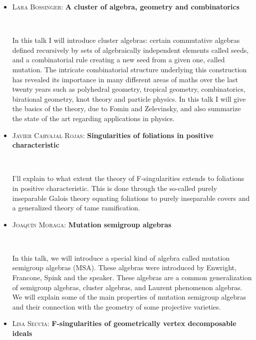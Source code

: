 \documentclass[12pt]{amsart}
\begin{document}
\begin{itemize}

\vfill

\item \textsc{Lara Bossinger:} \textbf{A cluster of algebra, geometry and combinatorics}

\

\noindent  In this talk I will introduce cluster algebras: certain commutative algebras defined recursively by sets of algebraically independent elements called seeds, and a combinatorial rule creating a new seed from a given one, called mutation. The intricate combinatorial structure underlying this construction has revealed its importance in many different areas of maths over the last twenty years such as polyhedral geometry, tropical geometry, combinatorics, birational geometry, knot theory and particle physics. In this talk I will give the basics of the theory, due to Fomin and Zelevinsky, and also summarize the state of the art regarding applications in physics.

\vfill

\item  \textsc{Javier Carvajal Rojas:}  \textbf{Singularities of foliations in positive characteristic}

\

\noindent  I'll explain to what extent the theory of F-singularities extends to foliations in positive characteristic. This is done through the so-called purely inseparable Galois theory equating foliations to purely inseparable covers and a generalized theory of tame ramification. 

\vfill

\item  \textsc{Joaqu\'in Moraga:} \textbf{Mutation semigroup algebras}

\

\noindent  In this talk, we will introduce a special kind of algebra called mutation semigroup algebras (MSA). 
These algebras were introduced by Enwright, Francone, Spink and the speaker. 
These algebras are a common generalization of semigroup algebras, cluster algebras, and Laurent phenomenon algebras. 
We will explain some of the main properties of mutation semigroup algebras and their connection with the geometry of some projective varieties.

\vfill


\item \textsc{Lisa Seccia:} \textbf{F-singularities of geometrically vertex decomposable ideals}


\end{itemize}
\end{document}

